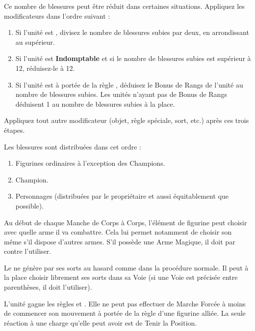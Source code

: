 Ce nombre de blessures peut être réduit dans certaines situations. Appliquez les modificateurs dans l'ordre suivant :
\begin{enumerate}
\item Si l'unité est \textbf{\stubborn}, divisez le nombre de blessures subies par deux, en arrondissant au supérieur.
\item Si l'unité est \textbf{Indomptable} et si le nombre de blessures subies est supérieur à 12, réduisez-le à 12.
\item Si l'unité est à portée de la règle \textbf{\holdyourground}, déduisez le Bonus de Rangs de l'unité au nombre de blessures subies. Les unités n'ayant pas de Bonus de Rangs déduisent 1 au nombre de blessures subies à la place.
\end{enumerate}
Appliquez tout autre modificateur (objet, règle spéciale, sort, etc.) après ces trois étapes.

Les blessures sont distribuées dans cet ordre :
\begin{enumerate}
\item Figurines ordinaires à l'exception des Champions.
\item Champion.
\item Personnages (distribuées par le propriétaire et aussi équitablement que possible).
\end{enumerate}


Au début de chaque Manche de Corps à Corps, l'élément de figurine peut choisir avec quelle arme il va combattre. Cela lui permet notamment de choisir son \hw{} même s'il dispose d'autres armes. S'il possède une Arme Magique, il doit par contre l'utiliser.


Le \wizard{} ne génère par ses sorts au hasard comme dans la procédure normale. Il peut à la place choisir librement ses sorts dans sa Voie (si une Voie est précisée entre parenthèses, il doit l'utiliser).


L'unité gagne les règles \immunetopsychology{} et \unstable{}. Elle ne peut pas effectuer de Marche Forcée à moins de commencer son mouvement à portée de la règle \inspiringpresence{} d'une figurine alliée. La seule réaction à une charge qu'elle peut avoir est de Tenir la Position.


